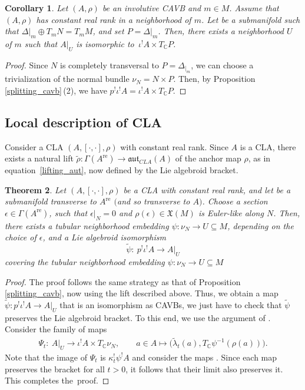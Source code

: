 \documentclass[11pt]{article}
\numberwithin{equation}{section}
\numberwithin{equation}{section}
\newtheorem{Theorem}{Theorem}[section]
\newtheorem{Corollary}[Theorem]{Corollary}
\newcommand{\C}{{\mathbb{C}}}
\DeclareMathOperator{\real}{re}
\begin{document}
\begin{Corollary}%
Let $(A,\rho)$ be an involutive CAVB and $m\in M$. Assume that $(A,\rho)$ has constant real rank in a neighborhood of $m$. Let  be a submanifold such that $\Delta|_m\oplus T_m N=T_m M$, and set $P=\Delta{|_m}$. Then, there exists a neighborhood $U$ of $m$ such that $A{|_{U}}$ is isomorphic to~${\iota^! A\times T_{\C}P}$.
\end{Corollary}
\begin{proof}
Since $N$ is completely transversal to $P=\Delta_{|_m}$, we can choose a trivialization of the normal bundle $\nu_N=N\times P$. Then, by Proposition \ref{splitting_cavb}\,(2), we have
$p^!\iota^! A=\iota^! A\times T_{\C}P$.
\end{proof}

\subsection{Local description of CLA}%
Consider a CLA $(A, [\cdot,\cdot],\rho)$ with constant real rank. Since $A$ is a CLA, there exists a natural lift
$\widetilde{\rho}\colon \Gamma(A^{\real})\to \mathfrak{aut}_{CLA}(A)$ of the anchor map $\rho$, as in equation~\eqref{lifting_aut}, now defined by the Lie algebroid bracket.
\begin{Theorem}\label{splitting_CLA}
Let $(A,[\cdot,\cdot],\rho)$ be a CLA with constant real rank, and let  be a submanifold transverse to $A^{\real}$ $($and so transverse to $A)$. Choose a section $\epsilon\in \Gamma(A^{\real})$, such that $\epsilon|_N=0$ and $\rho(\epsilon)\in \mathfrak{X}(M)$ is Euler-like along $N$. Then, there exists a tubular neighborhood embedding $\psi\colon \nu_N\to U\subseteq M$, depending on the choice of $\epsilon$, and a Lie algebroid isomorphism
\[
\widetilde{\psi}\colon\ p^{!}\iota^{!}A\to A|_U
\]
  covering the tubular neighborhood embedding $\psi\colon \nu_N\to U\subseteq M$
\end{Theorem}
\begin{proof}
   The proof follows the same strategy as that of Proposition \ref{splitting_cavb}, now using the lift described above. Thus, we obtain a map $\widetilde{\psi}\colon p^{!}\iota^{!}A\xrightarrow{}A|_U$ that is an isomorphism as CAVBs, we just have to check that $\widetilde{\psi}$ preserves the Lie algebroid bracket. To this end, we use the argument of \cite[Remark 3.20]{bursztyn2019splitting}. Consider the family of maps
   \begin{align*}
   \Psi_t\colon \ A|_U \to \iota^! A\times T_{\C}\nu_N,\qquad
   a\in A \mapsto \bigl(\widetilde{\lambda}_t(a), T_{\C}\psi^{-1}(\rho(a))\bigr).
   \end{align*}
    Note that the image of $\Psi_t$ is $\kappa_t^! \psi^! A$ and consider the maps . Since each map  preserves the bracket for all $t>0$, it follows that their limit  also preserves it. This completes the~proof.
\end{proof}
\end{document}
